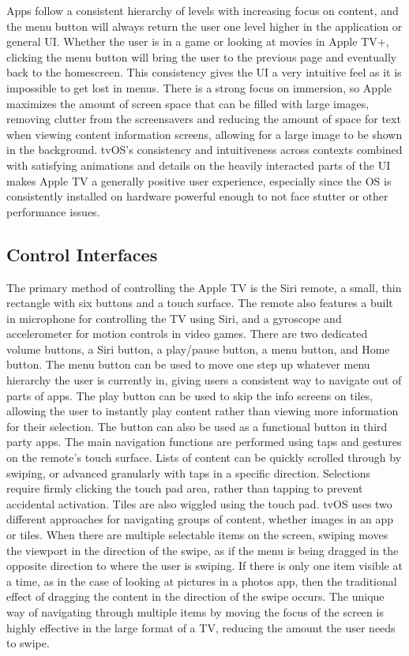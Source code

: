\documentclass[12pt, letterpaper]{article}
\begin{document}
Apps follow a consistent hierarchy of levels with increasing focus on content, and the menu button will always return the user one level higher in the application or general UI.  Whether 
the user is in a game or looking at movies in Apple TV+, clicking the menu button will bring the user to the previous page and eventually back to the homescreen.  This consistency gives the UI a very intuitive feel as it is impossible to get lost in menus.  There is a strong focus on immersion, so Apple maximizes the amount of screen space that can be filled with large images, removing clutter from the screensavers and reducing the amount of space for text when viewing content information screens, allowing for a large image to be shown in the background. tvOS's consistency and intuitiveness across contexts combined with satisfying animations and details on the heavily interacted parts of the UI makes Apple TV a generally positive user experience,
especially since the OS is consistently installed on hardware powerful enough to not face stutter or other performance issues. 
\subsection{Control Interfaces}
The primary method of controlling the Apple TV is the Siri remote, a small, thin rectangle with six buttons and a touch surface. The remote also features a built in microphone for controlling the TV using Siri, and a gyroscope and accelerometer for motion controls in video games. There are two dedicated volume buttons, a Siri button, a play/pause button, a menu button, and Home button. The menu button can be used to move one step up whatever menu hierarchy the user is currently in, giving users a consistent way to navigate out of parts of apps. The play button can be used to skip the info screens on tiles, allowing the user to instantly play content rather than viewing more information for their selection. The button can also be used as a functional button
in third party apps. The main navigation functions are performed using taps and gestures on the remote's touch surface. Lists of content can be quickly scrolled through by swiping, or advanced granularly with taps in a specific direction. Selections require firmly clicking the touch pad area, rather than tapping to prevent accidental activation. Tiles are also wiggled using the touch pad.  tvOS uses two different approaches for navigating groups of content, whether images in an app or tiles.  When there are multiple selectable items on the screen, swiping moves the viewport in the direction of the swipe, as if the menu is being dragged in the opposite direction to where the user is swiping. If there is only one item visible at a time, as in the case of looking at 
pictures in a photos app, then the traditional effect of dragging the content in the direction of the swipe occurs.  The unique way of navigating through multiple items by moving the focus of the screen is highly effective in the large format of a TV, reducing the amount the user needs to swipe.  
\end{document}
